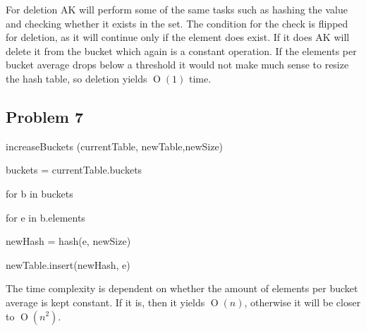 \documentclass[10pt,letterpaper,oneside]{article}
\newcommand{\Problem}[1]{\subsection*{Problem #1}}
\DeclareMathOperator{\Omicron}{O}
\newcommand{\BigOh}[1]{\Omicron(#1)}
\newcommand\tab[1][1cm]{\hspace*{#1}}
\begin{document}
For deletion AK will perform some of the same tasks such as hashing the value and checking whether it exists in the set. The condition for the check is flipped for deletion, as it will continue only if the element does exist. If it does AK will delete it from the bucket which again is a constant operation. If the elements per bucket average drops below a threshold it would not make much sense to resize the hash table, so deletion yields $\BigOh{1}$ time.

\Problem{7}



increaseBuckets (currentTable, newTable,newSize)

\tab	buckets = currentTable.buckets

\tab	for b in buckets

\tab\tab		for e in b.elements

\tab\tab\tab			newHash = hash(e, newSize)

\tab\tab\tab		          newTable.insert(newHash, e)

The time complexity is dependent on whether the amount of elements per bucket average is kept constant. If it is, then it yields $\BigOh{n}$, otherwise it will be closer to $\BigOh{n^2}$. 
\end{document}
